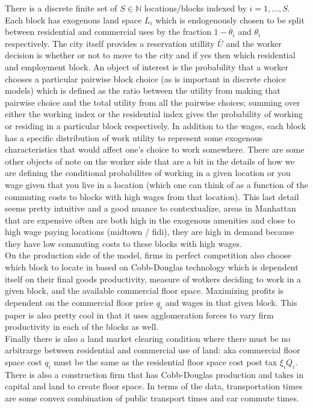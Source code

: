 \documentclass[11pt,english]{article}
\begin{document}
\noindent There is a discrete finite set of $S\in \mathbb{N}$ locations/blocks indexed by $i=1, \ldots, S$. Each block has exogenous land space $L_i$ which is endogenously chosen to be split between residential and commercial uses by the fraction $1-\theta_i$ and $\theta_i$ respectively. The city itself provides a reservation utillity $\bar{U}$ and the worker decision is whether or not to move to the city and if yes then which residential and employment block. An object of interest is the probability that a worker chooses a particular pairwise block choice (as is important in discrete choice models) which is defined as the ratio between the utility from making that pairwise choice and the total utility from all the pairwise choices; summing over either the working index or the residential index gives the probability of working or residing in a particular block respectively. In addition to the wages, each block has a specific distribution of work utility to represent some exogenous characteristics that would affect one's choice to work somewhere. There are some other objects of note on the worker side that are a bit in the details of how we are defining the conditional probabilites of working in a given location or you wage given that you live in a location (which one can think of as a function of the commuting costs to blocks with high wages from that location). This last detail seems pretty intuitive and a good nuance to contextualize, areas in Manhattan that are expensive often are both high in the exogenous amenities and close to high wage paying locations (midtown / fidi), they are high in demand because they have low commuting costs to these blocks with high wages.\\

\noindent On the production side of the model, firms in perfect competition also choose which block to locate in based on Cobb-Douglas technology which is dependent itself on their final goods productivity, measure of wotkers deciding to work in a given block, and the available commercial floor space. Maximizing profits is dependent on the commercial floor price $q_i$ and wages in that given block. This paper is also pretty cool in that it uses agglomeration forces to vary firm productivity in each of the blocks as well.\\

\noindent Finally there is also a land market clearing condition where there must be no arbitrarge between residential and commercial use of land: aka commercial floor space cost $q_i$ must be the same as the residential floor space cost post tax $\xi_i Q_i$. There is also a construction firm that has Cobb-Douglas production and takes in capital and land to create floor space. In terms of the data, transportation times are some convex combination of public transport times and car commute times.
\end{document}

